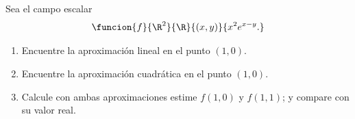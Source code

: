 \documentclass[a4,11pt]{aleph-examen}
\begin{document}
\begin{preguntas}
\begin{respuesta}
\begin{respuesta}

\item 
    Sea el campo escalar
    \[
        \funcion{f}{\R^2}{\R}{(x,y)}{x^2e^{x-y}.}
    \]
\begin{enumerate}
    \item Encuentre la aproximación lineal en el punto $(1,0)$.
    \item Encuentre la aproximación cuadrática en el punto $(1,0)$.
    \item Calcule con ambas aproximaciones estime $f(1,0)$ y $f(1,1)$; y compare con su valor real.
\end{enumerate}


\end{respuesta}
\end{respuesta}
\end{preguntas}
\end{document}
